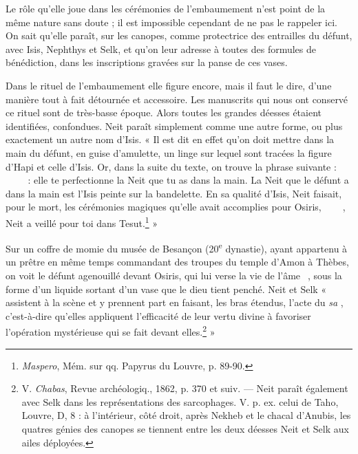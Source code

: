 \documentclass[letterpaper,twocolumn,openany,nodeprecatedcode]{dndbook}
\newcommand*\hieroAAAW{\raisebox{0.5ex}{}}
\newcommand*\hieroAABR{}
\newcommand*\hieroAACS{}
\newcommand*\hieroAADG{}
\newcommand*\hieroAADM{}
\newcommand*\hieroAADR{}
\newcommand*\hieroAAEX{}
\newcommand*\hieroAAMP{}
\newcommand*\hieroAARZ{}
\newcommand*\hieroAATD{}
\newcommand*\hieroAATE{}
\newcommand*\hieroAATF{}
\newcommand*\hieroAATG{}
\newcommand*\hieroAATH{}
\newcommand*\hieroAATI{}
\newcommand*\hieroAATJ{}
\newcommand*\hieroAATK{}
\newcommand*\hieroAATL{}
\newcommand*\hieroAATM{}
\newcommand*\hieroAATN{}
\newcommand*\hieroAATO{}
\begin{document}
Le rôle qu'elle joue dans les cérémonies de l'embaumement n'est point de la même nature sans doute ; il est impossible cependant de ne pas le rappeler ici. On sait qu'elle paraît, sur les canopes, comme protectrice des entrailles du défunt, avec Isis, Nephthys et Selk, et qu'on leur adresse à toutes des formules de bénédiction, dans les inscriptions gravées sur la panse de ces vases.

Dans le rituel de l'embaumement elle figure encore, mais il faut le dire, d'une manière tout à fait détournée et accessoire. Les manuscrits qui nous ont conservé ce rituel sont de très-basse époque. Alors toutes les grandes déesses étaient identifiées, confondues. Neit paraît simplement comme une autre forme, ou plus exactement un autre nom d'Isis. « Il est dit en effet qu'on doit mettre dans la main du défunt, en guise d'amulette, un linge sur lequel sont tracées la figure d'Hapi et celle d'Isis. Or, dans la suite du texte, on trouve la phrase suivante : $\hieroAACS\:\hieroAATD\:\hieroAATE\allowbreak\:\hieroAATF\:\hieroAAEX\:\hieroAATG\allowbreak\:\hieroAADR\:\hieroAABR\allowbreak\:\hieroAATH\:\hieroAATI$ : elle te perfectionne la Neit que tu as dans la main. La Neit que le défunt a dans la main est l'Isis peinte sur la bandelette. En sa qualité d'Isis, Neit faisait, pour le mort, les cérémonies magiques qu'elle avait accomplies pour Osiris, $\hieroAADG\:\hieroAATJ\:\hieroAATK\allowbreak\:\hieroAAEX\:\hieroAABR\:\hieroAATL\:\hieroAATM\allowbreak\:\hieroAAMP\:\hieroAAAW$, Neit a veillé pour toi dans Tesut.\footnote{\emph{Maspero}, Mém. sur qq. Papyrus du Louvre, p. 89-90.} »

Sur un coffre de momie du musée de Besançon (20\textsuperscript{e} dynastie), ayant appartenu à un prêtre en même temps commandant des troupes du temple d'Amon à Thèbes, on voit le défunt agenouillé devant Osiris, qui lui verse la vie de l'âme $\hieroAARZ\:\hieroAATN\:\hieroAADM$, sous la forme d'un liquide sortant d'un vase que le dieu tient penché. Neit et Selk « assistent à la scène et y prennent part en faisant, les bras étendus, l'acte du \emph{sa} $\hieroAATO$, c'est-à-dire qu'elles appliquent l'efficacité de leur vertu divine à favoriser l'opération mystérieuse qui se fait devant elles.\footnote{V. \emph{Chabas}, Revue archéologiq., 1862, p. 370 et suiv. --- Neit paraît également avec Selk dans les représentations des sarcophages. V. p. ex. celui de Taho, Louvre, D, 8 : à l'intérieur, côté droit, après Nekheb et le chacal d'Anubis, les quatres génies des canopes se tiennent entre les deux déesses Neit et Selk aux ailes déployées.} »
\end{document}
